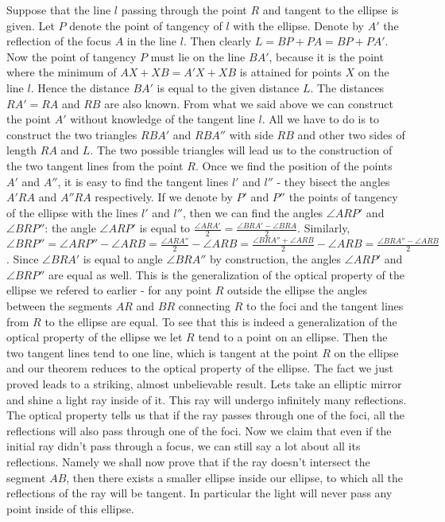 Suppose that the line $l$ passing through the point $R$ and tangent to the ellipse is given. Let $P$ denote the point of tangency of $l$ with the ellipse. Denote by $A'$ the reflection of the focus $A$ in the line $l$. Then clearly $L=BP+PA=BP+PA'$. Now the point of tangency $P$ must lie on the line $BA'$, because it is the point where the minimum of $AX+XB=A'X+XB$ is attained for points $X$ on the line $l$. Hence the distance $BA'$ is equal to the given distance $L$. The distances $RA'=RA$ and $RB$ are also known.
From what we said above we can construct the point $A'$ without knowledge of the tangent line $l$. All we have to do is to construct the two triangles $RBA'$ and $RBA''$ with side $RB$ and other two sides of length $RA$ and $L$. The two possible triangles will lead us to the construction of the two tangent lines from the point $R$. Once we find the position of the points $A'$ and $A''$, it is easy to find the tangent lines $l'$ and $l''$ - they bisect the angles $A'RA$ and $A''RA$ respectively.
If we denote by $P'$ and $P''$ the points of tangency of the ellipse with the lines $l'$ and $l''$, then we can find the angles $\angle ARP'$ and $\angle BRP''$: the angle $\angle ARP'$ is equal to $\frac{\angle ARA'}{2}=\frac{\angle BRA'-\angle BRA}{2}$. Similarly, $\angle BRP''=\angle ARP'' - \angle ARB=\frac{\angle ARA''}{2}-\angle ARB= \frac{\angle BRA''+\angle ARB}{2}-\angle ARB=\frac{\angle BRA''-\angle ARB}{2}$. Since $\angle BRA'$ is equal to angle $\angle BRA''$ by construction, the angles $\angle ARP'$ and $\angle BRP''$ are equal as well. This is the generalization of the optical property of the ellipse we refered to earlier - for any point $R$ outside the ellipse the angles between the segments $AR$ and $BR$ connecting $R$ to the foci and the tangent lines from $R$ to the ellipse are equal.
To see that this is indeed a generalization of the optical property of the ellipse we let $R$ tend to a point on an ellipse. Then the two tangent lines tend to one line, which is tangent at the point $R$ on the ellipse and our theorem reduces to the optical property of the ellipse.
The fact we just proved leads to a striking, almost unbelievable result. Lets take an elliptic mirror and shine a light ray inside of it. This ray will undergo infinitely many reflections. The optical property tells us that if the ray passes through one of the foci, all the reflections will also pass through one of the foci. Now we claim that even if the initial ray didn't pass through a focus, we can still say a lot about all its reflections. Namely we shall now prove that if the ray doesn't intersect the segment $AB$, then there exists a smaller ellipse inside our ellipse, to which all the reflections of the ray will be tangent. In particular the light will never pass any point inside of this ellipse.
